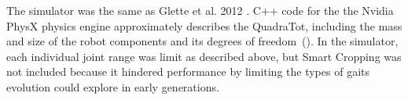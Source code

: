 The simulator was the same as Glette et al. 2012 \cite{glette}. C++ code for the the Nvidia PhysX physics engine approximately describes the QuadraTot, including the mass and size of the robot components and its degrees of freedom~(). In the simulator, each individual joint range was limit as described above, but Smart Cropping was not included because it hindered performance by limiting the types of gaits evolution could explore in early generations. 



